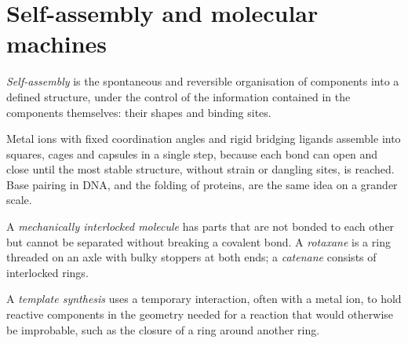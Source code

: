 \section{Self-assembly and molecular machines}

\begin{definition}\label{def:b3:supramolecular:self-assembly}
\emph{Self-assembly} is the spontaneous and reversible
organisation of components into a defined structure, under the control of the
information contained in the components themselves: their shapes and binding
sites.
\end{definition}

Metal ions with fixed coordination angles and rigid bridging ligands assemble
into squares, cages and capsules in a single step, because each bond can open
and close until the most stable structure, without strain or dangling sites,
is reached. Base pairing in DNA, and the folding of proteins, are the same idea
on a grander scale.

\begin{definition}\label{def:b3:supramolecular:interlocked}
A \emph{mechanically interlocked molecule} has parts that are not bonded to each other but cannot be separated
without breaking a covalent bond. A \emph{rotaxane} is a ring
threaded on an axle with bulky stoppers at both ends; a
\emph{catenane} consists of interlocked rings.
\end{definition}

\begin{definition}\label{def:b3:supramolecular:template}
A \emph{template synthesis} uses a temporary
interaction, often with a metal ion, to hold reactive components in the
geometry needed for a reaction that would otherwise be improbable, such as the
closure of a ring around another ring.
\end{definition}

